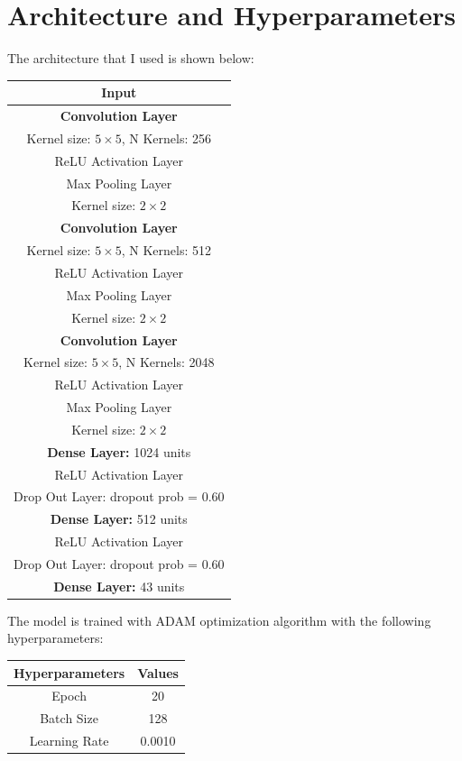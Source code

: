 \documentclass[12pt,twoside]{article}
\begin{document}
\newpage

\section{Architecture and Hyperparameters}
The architecture that I used is shown below:

\begin{center}
\begin{tabular}{|c|}
\hline
\textbf{Input} \\\hline
\textbf{Convolution Layer} \\
Kernel size: $5\times 5$, N Kernels: 256 \\\hline
ReLU Activation Layer \\\hline
Max Pooling Layer \\
Kernel size: $2\times 2$\\\hline
\textbf{Convolution Layer} \\
Kernel size: $5\times 5$, N Kernels: 512 \\\hline
ReLU Activation Layer \\\hline
Max Pooling Layer \\\hline
Kernel size: $2\times 2$\\\hline
\textbf{Convolution Layer} \\
Kernel size: $5\times 5$, N Kernels: 2048 \\\hline
ReLU Activation Layer \\\hline
Max Pooling Layer \\
Kernel size: $2\times 2$\\\hline
\textbf{Dense Layer:} 1024 units \\\hline
ReLU Activation Layer \\\hline
Drop Out Layer: dropout prob = 0.60 \\\hline
\textbf{Dense Layer:} 512 units \\\hline
ReLU Activation Layer \\\hline
Drop Out Layer: dropout prob = 0.60 \\\hline
\textbf{Dense Layer:} 43 units \\\hline
\end{tabular}
\end{center}

The model is trained with ADAM optimization algorithm with the following hyperparameters:

\begin{center}
\begin{tabular}{|c|c|}
\hline
Hyperparameters		& 		Values\\\hline
Epoch						&		20\\
Batch Size				&		128\\
Learning Rate			&		0.0010\\\hline
\end{tabular}
\end{center}
\end{document}

